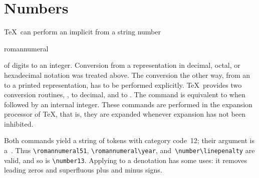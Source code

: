 \documentclass[twoside,letterpaper,openright]{rapport3}
\begin{document}
\section{Numbers}

\TeX\ can perform an implicit  from a string
\cstoidx number\par\cstoidx romannumeral\par
of digits to an integer. Conversion from a representation
in decimal, octal, or hexadecimal notation was
treated above. The conversion the other way,
from an  to a printed representation,
has to be performed explicitly.
\TeX\ provides two conversion routines,
, to decimal, and  to
.
The command  is equivalent to 
when followed by an internal integer.
These commands are performed in the expansion processor of \TeX, that is,
they are expanded whenever expansion has not been inhibited.

Both commands
yield a string of tokens with category code~12;
their argument is a~.
Thus \verb-\romannumeral51-, \verb-\romannumeral\year-,
and~\verb-\number\linepenalty- are valid, and so is \verb-\number13-.
Applying  to a denotation has some uses:
it removes leading zeros and superfluous plus and minus signs.
\end{document}

